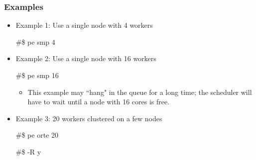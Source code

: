 \documentclass{beamer}
\begin{document}
\begin{frame}[fragile]
\frametitle{Examples}
\begin{itemize}
\item Example 1: Use a single node with 4 workers
\begin{semiverbatim}
\#\$ pe smp 4
\end{semiverbatim}
\item Example 2: Use a single node with 16 workers
\begin{semiverbatim}
\#\$ pe smp 16
\end{semiverbatim}
\begin{itemize}
\item This example may ``hang" in the queue for a long time; the scheduler will have to wait until a node with 16 cores is free.
\end{itemize}
\item Example 3: 20 workers clustered on a few nodes
\begin{semiverbatim}
\#\$ pe orte 20
\end{semiverbatim}
\vspace{-0.4cm}
\begin{semiverbatim}
\#\$ -R y 
\end{semiverbatim}
\end{itemize}
\end{frame}
\end{document}

